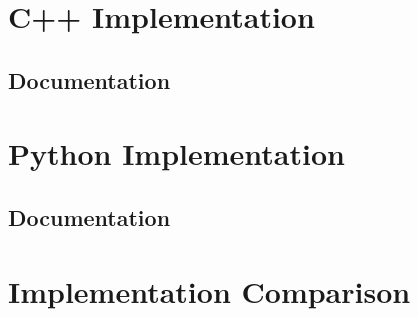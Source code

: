 \section{C++ Implementation}
\subsection{Documentation}

\section{Python Implementation}
\subsection{Documentation}

\section{Implementation Comparison}

\filbreak
